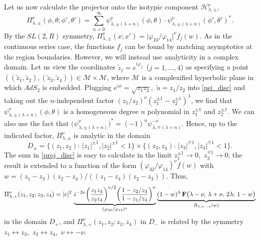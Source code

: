 \documentclass[12pt]{article}
\newcommand{\hgfs}{\mathbf{F}}
\newcommand{\lt}{\left}
\newcommand{\rt}{\right}
\newcommand{\vp}{\varphi}
\newcommand{\calH}{\mathcal{H}}
\newcommand{\calM}{\mathcal{M}}
\newcommand{\RR}{\mathbb{R}}
\DeclareMathOperator{\SL}{SL}
\DeclareMathOperator{\AdS}{AdS}
\newcommand{\tu}{\tilde{u}}
\newcommand{\tz}{\tilde{z}}
\newcommand{\lam}{\lambda}
\newcommand{\ov}{\over}
\def\widetilde#1{#1}%
\def\AdS{AdS}
\def\SL{SL}
\def\RR{R}
\begin{document}
Let us now calculate the projector onto the isotypic component $\calH^{\nu}_{\lambda,\pm}$,
\begin{equation}\label{proj_disc}
\Pi^{\nu}_{\lambda,\pm}(\phi,\theta;\phi',\theta')
=\sum_{n=0}^{\infty}\psi^{\nu}_{\lam,\pm(\lam+n)}(\phi,\theta)
\cdot\psi^{\nu}_{\lam,\pm(\lam+n)}(\phi',\theta')^{*}.
\end{equation}
By the $\widetilde{\SL}(2,\RR)$ symmetry, $\Pi^{\nu}_{\lambda,\pm}(x;x')
=\bigl|\vp_{23}/\vp_{14}\bigr|^{\nu}f_{j}(w)$. As in the continuous series case, the functions $f_{j}$ can be found by matching asymptotics at the region boundaries. However, we will instead use analyticity in a complex domain. Let us view the coordinates $\tz_j=e^{i\vp_j}$\, ($j=1,\dots,4$) as specifying a point $\lt((\tz_1,\tz_2),(\tz_3,\tz_4)\rt) \in\calM\times\calM$, where $\calM$ is a complexified hyperbolic plane in which $\AdS_2$ is embedded. Plugging $e^{i\phi}=\sqrt{z_1z_2}$,\, $\tu=z_1/z_2$ into \eqref{psi_disc} and taking out the $n$-independent factor $(z_1/z_2)^{\nu}(z_1^{\pm1}-z_2^{\pm1})^{\lambda}$, we find that $\psi^{\nu}_{\lam,\pm(\lam+n)}(\phi,\theta)$ is a homogeneous degree $n$ polynomial in $z_1^{\pm1}$ and $z_2^{\pm1}$. We can also use the fact that $\bigl(\psi^{\nu}_{\lam,\pm(\lam+n)}\bigr)^* =(-1)^{n} \psi^{-\nu}_{\lam,\mp(\lam+n)}$. Hence, up to the indicated factor, $\Pi^{\nu}_{\lambda,\pm}$ is analytic in the domain
\begin{equation}
D_{\pm}=\bigl\{ (z_1, z_2):\, |z_1|^{\pm1}, |z_2|^{\pm1} < 1 \bigr\}
\times \bigl\{ (z_3, z_4):\, |z_3|^{\mp1}, |z_4|^{\mp1} <1 \bigr\}.
\end{equation}
The sum in \eqref{proj_disc} is easy to calculate in the limit $z_1^{\pm1} \to 0$,\, $z_3^{\mp 1} \to 0$; the result is extended to a function of the form $(\vp_{32}/\vp_{14})^{\nu}f(w)$ with $w=(z_1-z_3)(z_2-z_4)/((z_1-z_4)(z_2-z_3))$. Thus,
\begin{equation}\label{tPsip}
\Pi^{\nu}_{\lambda,+}(z_1, z_2; z_3, z_4)
=|c|^2\,\underbrace{i^{-2\nu}\biggl({z_1 z_3 \ov z_2 z_4}\biggr)^{\nu/2}
\biggl({1-z_2 / z_3 \ov 1-z_1/ z_4}\biggr)^{\nu}}_{(\vp_{32}/\vp_{14})^{\nu}}
\underbrace{(1-w)^\lam\, \hgfs\bigl(\lam-\nu,\,\lam + \nu,\,2\lam;\,1-w\bigr)}
_{B_{\lambda,\nu,-\nu}(w)}
\end{equation}
in the domain $D_{+}$, and $\Pi^{\nu}_{\lambda,+}(z_1,z_2;z_3,z_4)$ in $D_{-}$ is related by the symmetry $z_1 \leftrightarrow z_3$,\, $z_2 \leftrightarrow z_4$,\, $\nu \leftrightarrow -\nu$.
\end{document}
